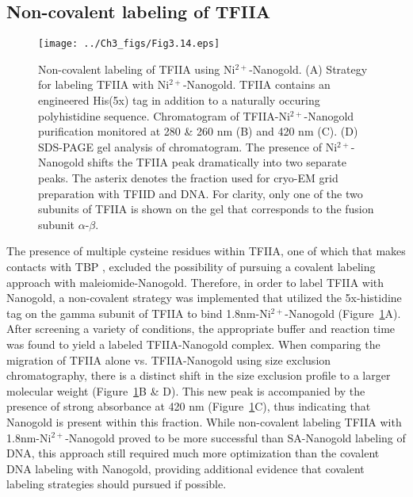 \subsection{Non-covalent labeling of TFIIA}
\begin{figure}
\centering
\texttt{[image: ../Ch3\_figs/Fig3.14.eps]}
\caption[Non-covalent labeling of TFIIA using Ni$^{2+}$-Nanogold]{Non-covalent labeling of TFIIA using Ni$^{2+}$-Nanogold. (A) Strategy for labeling TFIIA with Ni$^{2+}$-Nanogold. TFIIA contains an engineered His(5x) tag in addition to a naturally occuring polyhistidine sequence. Chromatogram of TFIIA-Ni$^{2+}$-Nanogold purification monitored at 280 \& 260 nm (B) and 420 nm (C). (D) SDS-PAGE gel analysis of chromatogram.  The presence of Ni$^{2+}$-Nanogold shifts the TFIIA peak dramatically into two separate peaks.  The asterix denotes the fraction used for cryo-EM grid preparation with TFIID and DNA. For clarity, only one of the two subunits of TFIIA is shown on the gel that corresponds to the fusion subunit $\alpha$-$\beta$.}
\label{fig:Fig3.14}
\end{figure}
\indent The presence of multiple cysteine residues within TFIIA, one of which that makes contacts with TBP \cite{Bleichenbacher_2003}, excluded the possibility of pursuing a covalent labeling approach with maleiomide-Nanogold.  Therefore, in order to label TFIIA with Nanogold, a non-covalent strategy was implemented that utilized the 5x-histidine tag on the gamma subunit of TFIIA to bind 1.8nm-Ni$^{2+}$-Nanogold (Figure~\ref{fig:Fig3.14}A). After screening a variety of conditions, the appropriate buffer and reaction time was found to yield a labeled TFIIA-Nanogold complex. When comparing the migration of TFIIA alone vs. TFIIA-Nanogold using size exclusion chromatography, there is a distinct shift in the size exclusion profile to a larger molecular weight (Figure~\ref{fig:Fig3.14}B \& D). This new peak is accompanied by the presence of strong absorbance at 420 nm (Figure~\ref{fig:Fig3.14}C), thus indicating that Nanogold is present within this fraction. While non-covalent labeling TFIIA with 1.8nm-Ni$^{2+}$-Nanogold proved to be more successful than SA-Nanogold labeling of DNA, this approach still required much more optimization than the covalent DNA labeling with Nanogold, providing additional evidence that covalent labeling strategies should pursued if possible.  \\

